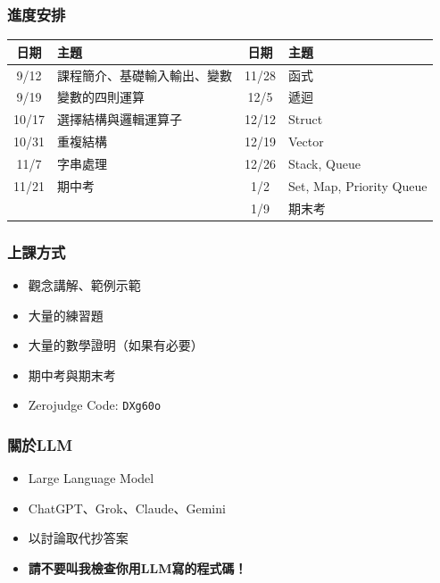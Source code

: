 \documentclass[xcolor=dvipsnames]{beamer}
\begin{document}
    \begin{frame}
        \frametitle{進度安排}
        \begin{table}[h]
        \begin{tabular}{cl  cl}
        \toprule
        日期 & 主題 & 日期 & 主題 \\
        \midrule
        9/12  & 課程簡介、基礎輸入輸出、變數   & 11/28 & 函式 \\
        9/19  & 變數的四則運算           & 12/5  & 遞迴 \\
        10/17 & 選擇結構與邏輯運算子     & 12/12 & Struct \\
        10/31 & 重複結構                 & 12/19 & Vector \\
        11/7  & 字串處理                 & 12/26 & Stack, Queue \\
        11/21 & 期中考                   & 1/2   & Set, Map, Priority Queue \\
            &                          & 1/9   & 期末考 \\
        \bottomrule
        \end{tabular}
        \end{table}
    \end{frame}

    \begin{frame}
        \frametitle{上課方式}
        \begin{itemize}
            \item 觀念講解、範例示範
            \item 大量的練習題
            \item 大量的數學證明（如果有必要）
            \item 期中考與期末考
            \item Zerojudge Code: \texttt{DXg60o}
        \end{itemize}
    \end{frame}

    \begin{frame}
        \frametitle{關於LLM}
        \begin{itemize}
            \item Large Language Model
            \item ChatGPT、Grok、Claude、Gemini
            \item 以討論取代抄答案
            \item \textbf{請不要叫我檢查你用LLM寫的程式碼！}
        \end{itemize}
    \end{frame}
\end{document}
